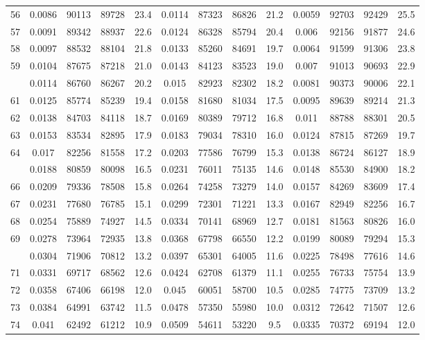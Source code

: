 \documentclass[
  14pt,
]{article}
\begin{document}
\begin{longtable}[t]{lcccccccccccc}
56 & 0.0086 & 90113 & 89728 & 23.4 & 0.0114 & 87323 & 86826 & 21.2 & 0.0059 & 92703 & 92429 & 25.5\\
57 & 0.0091 & 89342 & 88937 & 22.6 & 0.0124 & 86328 & 85794 & 20.4 & 0.006 & 92156 & 91877 & 24.6\\
58 & 0.0097 & 88532 & 88104 & 21.8 & 0.0133 & 85260 & 84691 & 19.7 & 0.0064 & 91599 & 91306 & 23.8\\
59 & 0.0104 & 87675 & 87218 & 21.0 & 0.0143 & 84123 & 83523 & 19.0 & 0.007 & 91013 & 90693 & 22.9\\
\addlinespace
60 & 0.0114 & 86760 & 86267 & 20.2 & 0.015 & 82923 & 82302 & 18.2 & 0.0081 & 90373 & 90006 & 22.1\\
61 & 0.0125 & 85774 & 85239 & 19.4 & 0.0158 & 81680 & 81034 & 17.5 & 0.0095 & 89639 & 89214 & 21.3\\
62 & 0.0138 & 84703 & 84118 & 18.7 & 0.0169 & 80389 & 79712 & 16.8 & 0.011 & 88788 & 88301 & 20.5\\
63 & 0.0153 & 83534 & 82895 & 17.9 & 0.0183 & 79034 & 78310 & 16.0 & 0.0124 & 87815 & 87269 & 19.7\\
64 & 0.017 & 82256 & 81558 & 17.2 & 0.0203 & 77586 & 76799 & 15.3 & 0.0138 & 86724 & 86127 & 18.9\\
\addlinespace
65 & 0.0188 & 80859 & 80098 & 16.5 & 0.0231 & 76011 & 75135 & 14.6 & 0.0148 & 85530 & 84900 & 18.2\\
66 & 0.0209 & 79336 & 78508 & 15.8 & 0.0264 & 74258 & 73279 & 14.0 & 0.0157 & 84269 & 83609 & 17.4\\
67 & 0.0231 & 77680 & 76785 & 15.1 & 0.0299 & 72301 & 71221 & 13.3 & 0.0167 & 82949 & 82256 & 16.7\\
68 & 0.0254 & 75889 & 74927 & 14.5 & 0.0334 & 70141 & 68969 & 12.7 & 0.0181 & 81563 & 80826 & 16.0\\
69 & 0.0278 & 73964 & 72935 & 13.8 & 0.0368 & 67798 & 66550 & 12.2 & 0.0199 & 80089 & 79294 & 15.3\\
\addlinespace
70 & 0.0304 & 71906 & 70812 & 13.2 & 0.0397 & 65301 & 64005 & 11.6 & 0.0225 & 78498 & 77616 & 14.6\\
71 & 0.0331 & 69717 & 68562 & 12.6 & 0.0424 & 62708 & 61379 & 11.1 & 0.0255 & 76733 & 75754 & 13.9\\
72 & 0.0358 & 67406 & 66198 & 12.0 & 0.045 & 60051 & 58700 & 10.5 & 0.0285 & 74775 & 73709 & 13.2\\
73 & 0.0384 & 64991 & 63742 & 11.5 & 0.0478 & 57350 & 55980 & 10.0 & 0.0312 & 72642 & 71507 & 12.6\\
74 & 0.041 & 62492 & 61212 & 10.9 & 0.0509 & 54611 & 53220 & 9.5 & 0.0335 & 70372 & 69194 & 12.0\\

\end{longtable}
\end{document}
